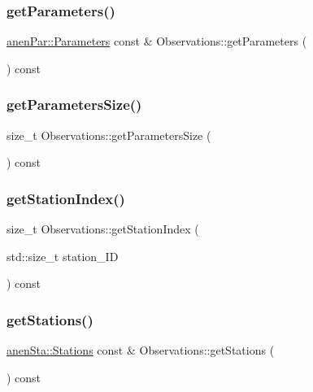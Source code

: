 \subsubsection{\texorpdfstring{get\+Parameters()}{getParameters()}}
{\footnotesize\ttfamily \mbox{\hyperlink{classanen_par_1_1_parameters}{anen\+Par\+::\+Parameters}} const  \& Observations\+::get\+Parameters (\begin{DoxyParamCaption}{ }\end{DoxyParamCaption}) const}

\mbox{\label{class_observations_aa54d9a904c390e964103bea086e065ee}} 
\subsubsection{\texorpdfstring{get\+Parameters\+Size()}{getParametersSize()}}
{\footnotesize\ttfamily size\+\_\+t Observations\+::get\+Parameters\+Size (\begin{DoxyParamCaption}{ }\end{DoxyParamCaption}) const}

\mbox{\label{class_observations_aa485e3d95a967b9b4efd5c4efaf0c9e1}} 
\subsubsection{\texorpdfstring{get\+Station\+Index()}{getStationIndex()}}
{\footnotesize\ttfamily size\+\_\+t Observations\+::get\+Station\+Index (\begin{DoxyParamCaption}\item[{std\+::size\+\_\+t}]{station\+\_\+\+ID }\end{DoxyParamCaption}) const}

\mbox{\label{class_observations_a0f6deefe6b26a0546ea6d7642d190bfa}} 
\subsubsection{\texorpdfstring{get\+Stations()}{getStations()}}
{\footnotesize\ttfamily \mbox{\hyperlink{classanen_sta_1_1_stations}{anen\+Sta\+::\+Stations}} const  \& Observations\+::get\+Stations (\begin{DoxyParamCaption}{ }\end{DoxyParamCaption}) const}

